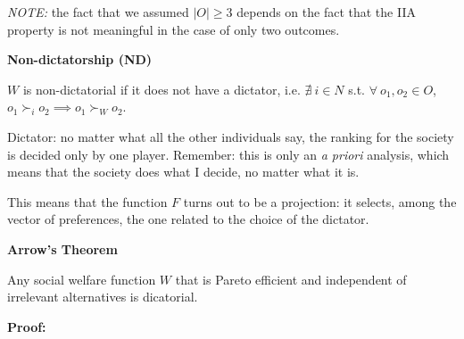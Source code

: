 \noindent \textit{NOTE:} the fact that we assumed $|O| \geq 3$ depends on the 
fact that the IIA property is not meaningful in the case of only two outcomes.

\bigskip
\noindent \textbf{Non-dictatorship (ND)}

\noindent $W$ is non-dictatorial if it does not have a dictator, i.e. 
$\nexists ~i \in N$ s.t. $\forall ~o_1,o_2 \in O$, $o_1 \succ_i o_2 \implies 
o_1 \succ_W o_2$.

\bigskip
\noindent Dictator: no matter what all the other individuals say, the ranking 
for the society is decided only by one player. Remember: this is only an 
\textit{a priori} analysis, which means that the society does what I decide, no 
matter what it is.

\noindent This means that the function $F$ turns out to be a projection: it 
selects, among the vector of preferences, the one related to the choice of the 
dictator.

\bigskip
\noindent \textbf{Arrow's Theorem}

\noindent Any social welfare function $W$ that is Pareto efficient and 
independent of irrelevant alternatives is dicatorial.

\bigskip
\noindent \textbf{Proof:}

